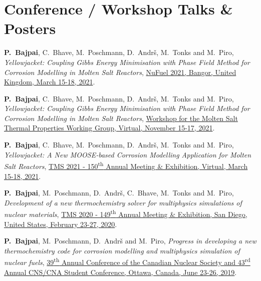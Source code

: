 \section*{Conference / Workshop Talks \& Posters}
\vspace*{1em}
\begin{enumerate}{\small\compresslist
\item \textbf{P.\ Bajpai}, {C.\ Bhave}, {M.\ Poschmann}, {D.\ Andr\v{s}}, {M.\ Tonks} and {M.\ Piro}, \textit{Yellowjacket: Coupling Gibbs Energy Minimisation with Phase Field Method for Corrosion Modelling in Molten Salt Reactors}, \href{https://nubu.nu/events/nufuel-workshop/}{NuFuel 2021, Bangor, United Kingdom, March 15-18, 2021}.
\item \textbf{P.\ Bajpai}, {C.\ Bhave}, {M.\ Poschmann}, {D.\ Andr\v{s}}, {M.\ Tonks} and {M.\ Piro}, \textit{Yellowjacket: Coupling Gibbs Energy Minimisation with Phase Field Method for Corrosion Modelling in Molten Salt Reactors}, \href{}{Workshop for the Molten Salt Thermal Properties Working Group, Virtual, November 15-17, 2021}.
\item \textbf{P.\ Bajpai}, {C.\ Bhave}, {M.\ Poschmann}, {D.\ Andr\v{s}}, {M.\ Tonks} and {M.\ Piro}, \textit{Yellowjacket: A New MOOSE‐based Corrosion Modelling Application for Molten Salt Reactors}, \href{https://www.tms.org/TMS2021}{TMS 2021  - 150\textsuperscript{th} Annual Meeting \& Exhibition, Virtual, March 15-18, 2021}.
\item \textbf{P.\ Bajpai}, {M.\ Poschmann}, {D.\ Andr\v{s}}, {C.\ Bhave}, {M.\ Tonks} and {M.\ Piro}, \textit{Development of a new thermochemistry solver for multiphysics simulations of nuclear materials}, \href{https://www.tms.org/TMS2020}{TMS 2020  - 149\textsuperscript{th} Annual Meeting \& Exhibition, San Diego, United States, February 23-27, 2020}.
\item \textbf{P.\ Bajpai}, {M.\ Poschmann}, {D.\ Andr\v{s}} and {M.\ Piro}, \textit{Progress in developing a new thermochemistry code for corrosion modelling and multiphysics simulation of nuclear fuels}, \href{http://cns-annual-conference.org/2019/index.html}{39\textsuperscript{th} Annual Conference of the Canadian Nuclear Society and 43\textsuperscript{rd} Annual CNS/CNA Student Conference, Ottawa, Canada, June 23-26, 2019}.
}\end{enumerate}



\newpage
\dedication{\textbf{P.\ Bajpai}, {M.\ Poschmann}, {M.H.A.\ Piro} \\ \textit{Derivations of partial molar excess Gibbs energy of mixing expressions for common thermodynamic models}\\  \href{https://doi.org/10.1007/s11669-021-00886-w}{Journal of Phase Equilibria and Diffusion, 42 (2021) 333-347}.}



